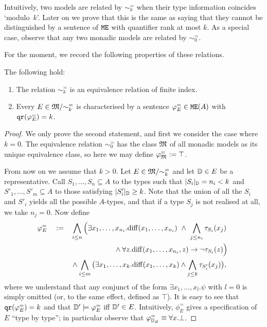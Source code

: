 Intuitively, two models are related by $\sim^=_k$ when their type information 
coincides `modulo~$k$'.
Later on we prove that this is the same as saying that they cannot be 
distinguished by a sentence of $\mathtt{M}\mathtt{E}$ with quantifier rank at most $k$. 
As a special case, observe that any two monadic models are related by 
$\sim^{=}_{0}$.

For the moment, we record the following properties of these relations.

\begin{proposition}\label{props:eqrelofoe} The following hold:
\begin{enumerate}
 pt
\item\label{props:eqrelofoe:i} 
The relation $\sim^=_k$ is an equivalence relation of finite index.
\item\label{props:eqrelofoe:ii} 
Every $E \in \mathfrak{M}/{\sim^=_k}$ is characterised by a sentence $\varphi^=_E \in 
\mathtt{M}\mathtt{E}(A)$ with $\mathtt{qr}(\varphi^=_E) = k$.
\end{enumerate}
\end{proposition}

\begin{proof}
We only prove the second statement,
and first we consider the case where $k=0$.
The equivalence relation $\sim^{=}_{0}$ has the class $\mathfrak{M}$ of all monadic 
models as its unique equivalence class, so here we may define $\varphi^{=}_{\mathfrak{M}}
\mathrel{:=} \top$.

From now on we assume that $k>0$.
Let $E \in \mathfrak{M}/{\sim^=_k}$ and let $\mathbb{D} \in E$ be a representative. 
Call $S_1,\dots,S_n \subseteq A$ to the types such that $|S_i|_{\mathbb{D}} = n_i< k$
and $S'_1,\dots,S'_m \subseteq A$ to those satisfying $|S'_i|_{\mathbb{D}} \geq k$. 
Note that the union of all the $S_i$ and $S'_i$ yields all the possible 
$A$-types, and that if a type $S_{j}$ is not realised at all, we take $n_j = 0$. 
Now define
\begin{align*}
\phi^=_E \quad \isdef \quad  
   & \bigwedge_{i\leq n} \Big(\exists x_1,\dots,x_{n_i}.
   \arediff{x_1,\dots,x_{n_i}} \ \land \ \bigwedge_{j\leq n_i} \tau_{S_i}(x_j)
\\ & \qquad\qquad\qquad \land 
   \forall z. \arediff{x_1,\dots,x_{n_i},z} \to \lnot\tau_{S_i}(z)\Big)\ 
\\ & \land \bigwedge_{i\leq m} \big(\exists x_1,\dots,x_k.\arediff{x_1,\dots,x_k} \land
    \bigwedge_{j\leq k} \tau_{S'_i}(x_j) \big),
\end{align*}
%
where we understand that any conjunct of the form $\exists x_1,
\dots,x_{l}.\psi$ with $l = 0$ is simply omitted (or, to the same effect, 
defined as $\top$).
It is easy to see that $\mathtt{qr}(\varphi^=_E) = k$ and that $\mathbb{D}' \models 
\varphi^=_E$ iff $\mathbb{D}' \in E$. 
Intuitively, $\phi^=_E$ gives a specification of $E$ ``type by type''; 
in particular observe that $\varphi^=_{\mathbb{D}_\varnothing} \equiv \forall x. \bot$.
\end{proof}


